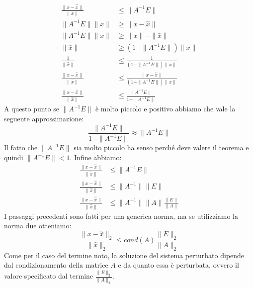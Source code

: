 \begin{equation*}
    \begin{aligned}
        \frac{\|x - \stackrel{\sim}{x}\|}{\|x\|} &\leq \|A^{-1}E\| \\
        \|A^{-1}E\| \|x\| &\geq \|x - \stackrel{\sim}{x}\|\\
        \|A^{-1}E\| \|x\| &\geq \|x\| - \|\stackrel{\sim}{x}\|\\
        \|\stackrel{\sim}{x}\| &\geq (1 - \|A^{-1}E\|) \|x\|\\
        \frac{1}{\|\stackrel{\sim}{x}\|} & \leq \frac{1}{(1 - \|A^{-1}E\|) \|x\|}\\
        \frac{\|x - \stackrel{\sim}{x}\|}{\|\stackrel{\sim}{x}\|} &\leq \frac{\|x - \stackrel{\sim}{x}\|}{(1 - \|A^{-1}E\|)\|x\|}\\
        \frac{\|x - \stackrel{\sim}{x}\|}{\|\stackrel{\sim}{x}\|} &\leq \frac{\|A^{-1}E\|}{1 - \|A^{-1}E\|}
    \end{aligned}
\end{equation*}
A questo punto se $\|A^{-1} E\|$ è molto piccolo e positivo abbiamo che vale la 
seguente approssimazione:
\begin{equation}
    \frac{\|A^{-1}E\|}{1 - \|A^{-1}E\|} \approx \|A^{-1}E\|
\end{equation}
Il fatto che $\|A^{-1} E\|$ sia molto piccolo ha senso perché deve valere il 
teorema e quindi $\|A^{-1} E\| < 1$. Infine abbiamo:
\begin{equation}
    \begin{aligned}
        \frac{\|x - \stackrel{\sim}{x}\|}{\|\stackrel{\sim}{x}\|} &\leq \|A^{-1}E\|\\
        \frac{\|x - \stackrel{\sim}{x}\|}{\|\stackrel{\sim}{x}\|} &\leq \|A^{-1}\|\|E\|\\
        \frac{\|x - \stackrel{\sim}{x}\|}{\|\stackrel{\sim}{x}\|} &\leq \|A^{-1}\|\|A\|\frac{\|E\|}{\|A\|}
    \end{aligned}
\end{equation}
I passaggi precedenti sono fatti per una generica norma, ma se utilizziamo la 
norma due otteniamo:
\begin{equation}
    \frac{\|x - \stackrel{\sim}{x}\|_2}{\|\stackrel{\sim}{x}\|_2} \leq cond(A) \frac{\|E\|_2}{\|A\|_2}
\end{equation}
Come per il caso del termine noto, la soluzione del sistema perturbato dipende 
dal condizionamento della matrice $A$ e da quanto essa è perturbata, ovvero il 
valore specificato dal termine $\frac{\|E\|_2}{\|A\|_2}$.